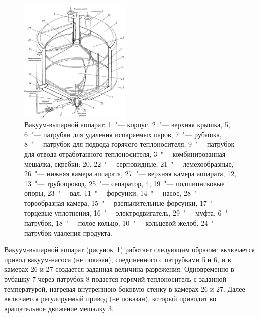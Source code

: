 % 
\begin{figure}
\centering
\includegraphics[width=0.48\textwidth]{figures/temp/ostrikov.jpg}
\caption[Вакуум-выпарной аппарат]{Вакуум-выпарной аппарат: 1~"--- корпус, 2~"--- верхняя крышка, 5, 6~"--- патрубки для удаления испаряемых паров, 7~"--- рубашка, 8~"--- патрубок для подвода горячего теплоносителя, 9~"--- патрубок для отвода отработанного теплоносителя, 3~"--- комбинированная мешалка, скребки: 20, 22~"--- серповидные, 21~"--- лемехообразные, 26~"--- нижняя камера аппарата, 27~"--- верхняя камера аппарата, 12, 13~"--- трубопровод, 25~"--- сепаратор, 4, 19~"--- подшипниковые опоры, 23~"--- вал, 11~"--- форсунки, 14~"--- насос, 28~"--- торообразная камера, 15~"--- распылительные форсунки, 17~"--- торцевые уплотнения, 16~"--- электродвигатель, 29~"--- муфта, 6~"--- патрубок, 18~"--- полое кольцо, 10~"--- кольцевой желоб, 24~"--- патрубок удаления продукта.}\label{fig:evaporation_app_ostrikov}
\end{figure}
Вакуум-выпарной аппарат \cite{Ostrikov.Vakuum.2011} (рисунок~\ref{fig:evaporation_app_ostrikov}) работает следующим образом: включается привод вакуум-насоса (не показан), соединенного с патрубками 5 и 6, и в камерах 26 и 27 создается заданная величина разрежения.
Одновременно в рубашку 7 через патрубок 8 подается горячий теплоноситель с заданной температурой, нагревая внутреннюю боковую стенку в камерах 26 и 27.
Далее включается регулируемый привод (не показан), который приводит во вращательное движение мешалку 3.
